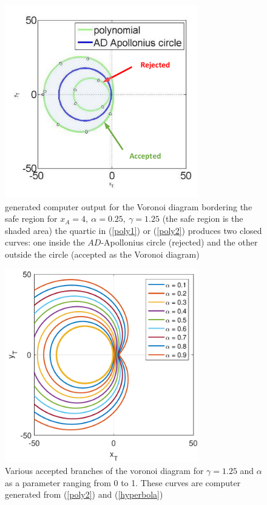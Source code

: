 \begin{figure}[htb]
\centering
\includegraphics[width=0.75\textwidth]{fig/g_1p25.pdf}
\caption{generated computer output for the Voronoi diagram bordering the safe region for $x_A=4,\ \alpha=0.25,\ \gamma=1.25$ (the safe region is the shaded area) the quartic in (\ref{poly1}) or (\ref{poly2}) produces two closed curves: one inside the $AD$-Apollonius circle (rejected) and the other outside the circle (accepted as the Voronoi diagram)}
\label{gamma=1.25}
\end{figure}

\begin{figure}[htb]
\centering
\includegraphics[width=0.75\textwidth]{fig/VAR_alpha_g_1p25.pdf}
\caption{Various accepted branches of the voronoi diagram for $\gamma=1.25$ and $\alpha$ as a parameter ranging from 0 to 1. These curves are computer generated from (\ref{poly2}) and (\ref{hyperbola})}
\label{VAR_alpha_gamma=1.25}
\end{figure}
